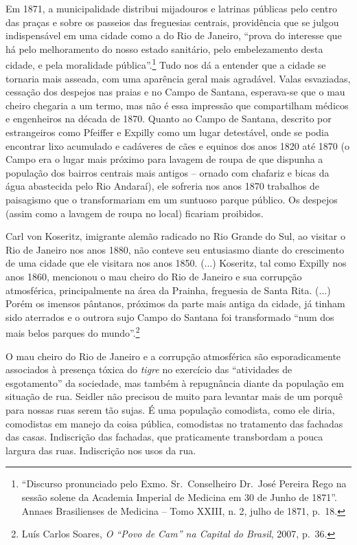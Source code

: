 Em 1871, a municipalidade distribui mijadouros e latrinas públicas pelo
centro das praças e sobre os passeios das freguesias centrais,
providência que se julgou indispensável em uma cidade como a do Rio de
Janeiro, ``prova do interesse que há pelo melhoramento do nosso estado
sanitário, pelo embelezamento desta cidade, e pela moralidade
pública''.\footnote{``Discurso pronunciado pelo Exmo. Sr.~Conselheiro
  Dr.~José Pereira Rego na sessão solene da Academia Imperial de
  Medicina em 30 de Junho de 1871''. Annaes Brasilienses de Medicina --
  Tomo XXIII, n. 2, julho de 1871, p.~18.} Tudo nos dá a entender que a
cidade se tornaria mais asseada, com uma aparência geral mais agradável.
Valas esvaziadas, cessação dos despejos nas praias e no Campo de
Santana, esperava-se que o mau cheiro chegaria a um termo, mas não é
essa impressão que compartilham médicos e engenheiros na década de 1870.
Quanto ao Campo de Santana, descrito por estrangeiros como Pfeiffer e
Expilly como um lugar detestável, onde se podia encontrar lixo acumulado
e cadáveres de cães e equinos dos anos 1820 até 1870 (o Campo era o
lugar mais próximo para lavagem de roupa de que dispunha a população dos
bairros centrais mais antigos -- ornado com chafariz e bicas da água
abastecida pelo Rio Andaraí), ele sofreria nos anos 1870 trabalhos de
paisagismo que o transformariam em um suntuoso parque público. Os
despejos (assim como a lavagem de roupa no local) ficariam proibidos.

Carl von Koseritz, imigrante alemão radicado no Rio Grande do Sul, ao
visitar o Rio de Janeiro nos anos 1880, não conteve seu entusiasmo
diante do crescimento de uma cidade que ele visitara nos anos 1850.
(...) Koseritz, tal como Expilly nos anos 1860, mencionou o mau cheiro
do Rio de Janeiro e sua corrupção atmosférica, principalmente na área da
Prainha, freguesia de Santa Rita. (...) Porém os imensos pântanos,
próximos da parte mais antiga da cidade, já tinham sido aterrados e o
outrora sujo Campo do Santana foi transformado ``num dos mais belos
parques do mundo''.\footnote{Luís Carlos Soares, \emph{O ``Povo de Cam''
  na Capital do Brasil}, 2007, p.~36.}

O mau cheiro do Rio de Janeiro e a corrupção atmosférica são
esporadicamente associados à presença tóxica do \emph{tigre} no
exercício das ``atividades de esgotamento'' da sociedade, mas também à
repugnância diante da população em situação de rua. Seidler não precisou
de muito para levantar mais de um porquê para nossas ruas serem tão
sujas. É uma população comodista, como ele diria, comodistas em manejo
da coisa pública, comodistas no tratamento das fachadas das casas.
Indiscrição das fachadas, que praticamente transbordam a pouca largura
das ruas. Indiscrição nos usos da rua.


